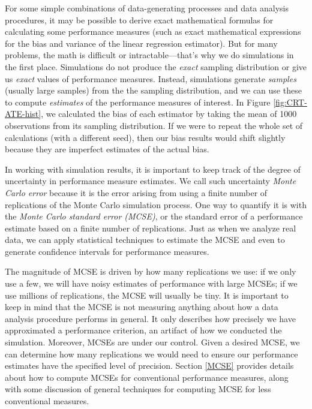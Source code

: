 \documentclass[
]{book}
\begin{document}
For some simple combinations of data-generating processes and data analysis procedures, it may be possible to derive exact mathematical formulas for calculating some performance measures (such as exact mathematical expressions for the bias and variance of the linear regression estimator).
But for many problems, the math is difficult or intractable---that's why we do simulations in the first place.
Simulations do not produce the \emph{exact} sampling distribution or give us \emph{exact} values of performance measures.
Instead, simulations generate \emph{samples} (usually large samples) from the the sampling distribution, and we can use these to compute \emph{estimates} of the performance measures of interest.
In Figure \ref{fig:CRT-ATE-hist}, we calculated the bias of each estimator by taking the mean of 1000 observations from its sampling distribution. If we were to repeat the whole set of calculations (with a different seed), then our bias results would shift slightly because they are imperfect estimates of the actual bias.

In working with simulation results, it is important to keep track of the degree of uncertainty in performance measure estimates.
We call such uncertainty \emph{Monte Carlo error} because it is the error arising from using a finite number of replications of the Monte Carlo simulation process.
One way to quantify it is with the \emph{Monte Carlo standard error (MCSE)}, or the standard error of a performance estimate based on a finite number of replications.
Just as when we analyze real data, we can apply statistical techniques to estimate the MCSE and even to generate confidence intervals for performance measures.

The magnitude of MCSE is driven by how many replications we use: if we only use a few, we will have noisy estimates of performance with large MCSEs; if we use millions of replications, the MCSE will usually be tiny.
It is important to keep in mind that the MCSE is not measuring anything about how a data analysis procedure performs in general.
It only describes how precisely we have approximated a performance criterion, an artifact of how we conducted the simulation.
Moreover, MCSEs are under our control.
Given a desired MCSE, we can determine how many replications we would need to ensure our performance estimates have the specified level of precision.
Section \ref{MCSE} provides details about how to compute MCSEs for conventional performance measures, along with some discussion of general techniques for computing MCSE for less conventional measures.
\end{document}
